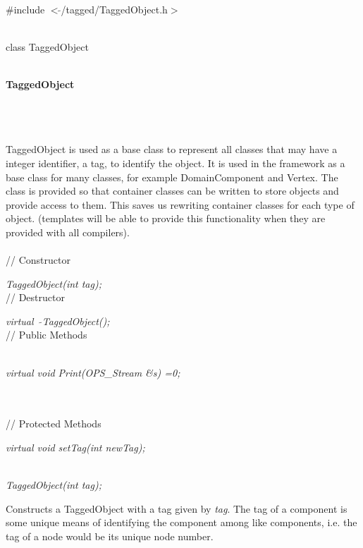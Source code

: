 
   \\
\#include $<\tilde{ }$/tagged/TaggedObject.h$>$ 


  \\
class TaggedObject  


 \\
 {\bf TaggedObject} 

\indent{} \\
\indent{} \\

  \\
\indent TaggedObject is used as a base class to represent all classes
that may have a integer identifier, a tag, to identify the object. It
is used in the framework as a base class for many classes, for example
DomainComponent and Vertex. The class is provided so that container
classes can be written to store objects and provide access to
them. This saves us rewriting container classes for each type of 
object. (templates will be able to provide this functionality when
they are provided with all compilers). \\ 

  \\
// Constructor  

{\em TaggedObject(int tag);}  \\ 

// Destructor  

{\em virtual~ $\tilde{}$TaggedObject();}  \\ 

// Public Methods  

 \\ 
{\em virtual void Print(OPS_Stream \&s) =0;} 

 \\  \\ 
// Protected Methods  

{\em virtual void setTag(int newTag);} 


  \\
{\em TaggedObject(int tag);}  

Constructs a TaggedObject with a tag given by {\em tag}. The tag of
a component is some unique means of identifying the component among
like components, i.e. the tag of a node would be its unique node number. \\

